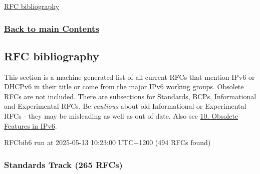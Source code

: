 \documentclass[
]{article}
\begin{document}
\hyperref[rfc-bibliography]{RFC bibliography}

\subsubsection{\texorpdfstring{\hyperref[list-of-contents]{Back to main
Contents}}{Back to main Contents}}\label{back-to-main-contents-10}

\pagebreak

\subsection{RFC bibliography}\label{rfc-bibliography}

This section is a machine-generated list of all current RFCs that
mention IPv6 or DHCPv6 in their title or come from the major IPv6
working groups. Obsolete RFCs are not included. There are subsections
for Standards, BCPs, Informational and Experimental RFCs. Be
\emph{cautious} about old Informational or Experimental RFCs - they may
be misleading as well as out of date. Also see
\hyperref[obsolete-features-in-ipv6]{10. Obsolete Features in IPv6}.

RFCbib6 run at 2025-05-13 10:23:00 UTC+1200 (494 RFCs found)

\subsubsection{Standards Track (265
RFCs)}\label{standards-track-265-rfcs}
\end{document}
